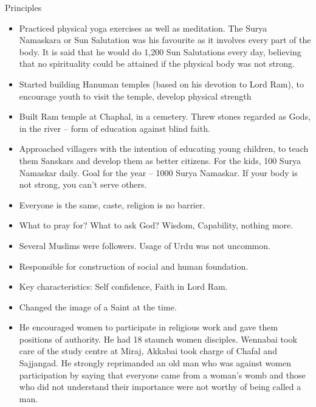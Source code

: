 Principles
\begin{itemize}
\item Practiced physical yoga exercises as well as meditation. The Surya Namaskara or Sun Salutation was his favourite as it involves every part of the body. It is said that he would do 1,200 Sun Salutations every day, believing that no spirituality could be attained if the physical body was not strong.
\item  Started building Hanuman temples (based on his devotion to Lord Ram), to encourage youth to visit the temple, develop physical strength
\item Built Ram temple at Chaphal, in a cemetery. Threw stones regarded as Gods, in the river – form of education against blind faith.
\item Approached villagers with the intention of educating young children, to teach them Sanskars and develop them as better citizens. For the kids, 100 Surya Namaskar daily. Goal for the year – 1000 Surya Namaskar. If your body is not strong, you can't serve others.
\item Everyone is the same, caste, religion is no barrier.
\item What to pray for? What to ask God? Wisdom, Capability, nothing more.
\item Several Muslims were followers. Usage of Urdu was not uncommon.
\item Responsible for construction of social and human foundation.
\item Key characteristics: Self confidence, Faith in Lord Ram.
\item Changed the image of a Saint at the time.
\item  He encouraged women to participate in religious work and gave them positions of authority. He had 18 staunch women disciples. Wennabai took care of the study centre at Miraj, Akkabai took charge of Chafal and Sajjangad. He strongly reprimanded an old man who was against women participation by saying that everyone came from a woman’s womb and those who did not understand their importance were not worthy of being called a man. 
\end{itemize}


